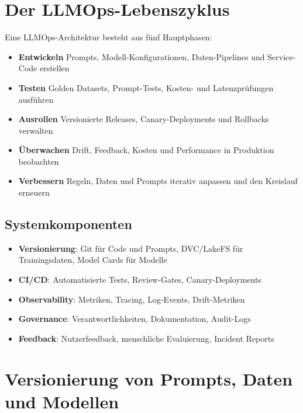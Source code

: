 \section{Der LLMOps-Lebenszyklus}

Eine LLMOps-Architektur besteht aus fünf Hauptphasen:

\begin{itemize}

    \item \textbf{Entwickeln} Prompts, Modell-Konfigurationen, Daten-Pipelines und Service-Code erstellen
    \item \textbf{Testen} Golden Datasets, Prompt-Tests, Kosten- und Latenzprüfungen ausführen
    \item \textbf{Ausrollen} Versionierte Releases, Canary-Deployments und Rollbacks verwalten
    \item \textbf{Überwachen} Drift, Feedback, Kosten und Performance in Produktion beobachten
    \item \textbf{Verbessern} Regeln, Daten und Prompts iterativ anpassen und den Kreislauf erneuern
\end{itemize}

\subsection{Systemkomponenten}

\begin{itemize}[leftmargin=*]
    \item \textbf{Versionierung}: Git für Code und Prompts, DVC/LakeFS für Trainingsdaten, Model Cards für Modelle
    \item \textbf{CI/CD}: Automatisierte Tests, Review-Gates, Canary-Deployments
    \item \textbf{Observability}: Metriken, Tracing, Log-Events, Drift-Metriken
    \item \textbf{Governance}: Verantwortlichkeiten, Dokumentation, Audit-Logs
    \item \textbf{Feedback}: Nutzerfeedback, menschliche Evaluierung, Incident Reports
\end{itemize}

\section{Versionierung von Prompts, Daten und Modellen}

